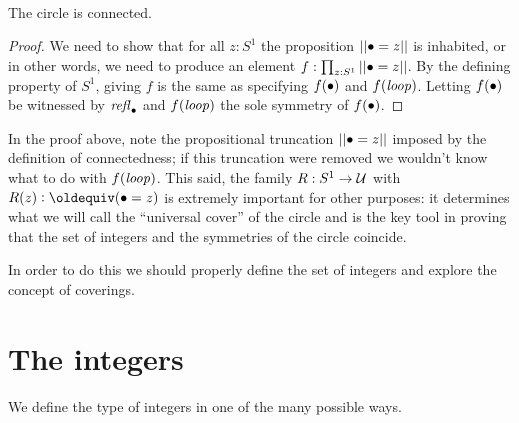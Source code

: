 \
\begin{lemma}\label{lem:circleisconnected}
  The circle is connected.
\end{lemma}
\begin{proof}
  We need to show that for all $z:S^1$ the proposition $||\bullet=z||$ is inhabited, or in other words, we need to produce an element  $f:\prod_{z:S^1}||\bullet=z||$.    By the defining property of $S^1$, giving $f$ is the same as specifying $f(\bullet)$ and $f(\mathit{loop})$.  Letting $f(\bullet)$ be witnessed by $\mathop{{\it refl}_{\bullet}}$ and $f(\mathit{loop})$ the sole symmetry of $f(\bullet)$.
\end{proof}
In the proof above, note the propositional truncation $||\bullet=z||$ imposed by the definition of connectedness; if this truncation were removed we wouldn't know what to do with $f(\mathit{loop})$.  This said, the family $R:S^1\to\mathcal{U}$ with $R(z)\defequi (\base=z)$ is extremely important for other purposes: it determines what we will call the ``universal cover'' of the circle and is the key tool in proving that the set of integers and the symmetries of the circle coincide.

In order to do this we should properly define the set of integers and explore the concept of coverings.


\section{The integers}
\label{sec:integers}

We define the type of integers in one of the many possible ways.

